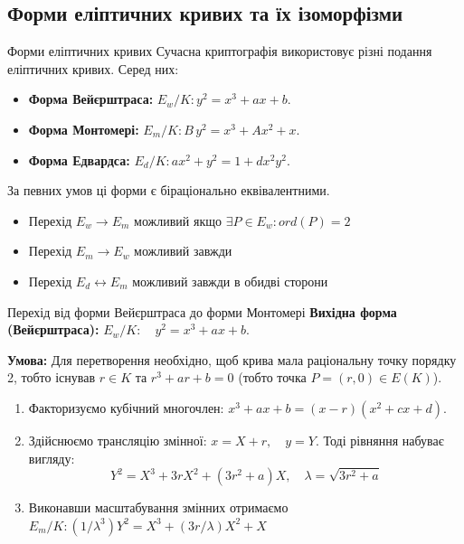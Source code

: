\documentclass[9pt]{beamer}
\begin{document}
\begin{darkframes}

\section{Форми еліптичних кривих та їх ізоморфізми}
\begin{frame}{Форми еліптичних кривих}
  Сучасна криптографія використовує різні подання еліптичних кривих. Серед них:
  \begin{itemize}
    \item \textbf{Форма Вейєрштраса:} \( E_w/K: y^2 = x^3 + ax + b \).
    \item \textbf{Форма Монтомері:} \( E_m/K: B\, y^2 = x^3 + A x^2 + x \).
    \item \textbf{Форма Едвардса:} \( E_d/K : a x^2 + y^2 = 1 + d x^2 y^2 \).
  \end{itemize}
  За певних умов ці форми є біраціонально еквівалентними. 
  \begin{itemize}
      \item Перехід $E_w \rightarrow E_m$ можливий якщо $\exists P\in E_w: ord(P)=2$
      \item Перехід $E_m \rightarrow E_w$ можливий завжди
      \item Перехід $E_d \leftrightarrow E_m$ можливий завжди в обидві сторони
  \end{itemize}
\end{frame}

\begin{frame}{Перехід від форми Вейєрштраса до форми Монтомері}
  \textbf{Вихідна форма (Вейєрштраса):}  
  $
  E_w/K: \quad y^2 = x^3 + ax + b.
  $
  
  \textbf{Умова:}  
  Для перетворення необхідно, щоб крива мала раціональну точку порядку 2, тобто існував \(r\in K\) та \(r^3+ar+b=0\) (тобто точка \(P=(r,0) \in E(K)\)).
  \begin{enumerate}
      \item Факторизуємо кубічний многочлен:
  $
  x^3 + ax + b = (x - r)(x^2 + cx + d).
  $
  \item Здійснюємо трансляцію змінної:
  $
  x = X + r, \quad y = Y.
  $
  Тоді рівняння набуває вигляду:
  \[
  Y^2 = X^3 + 3r X^2 + (3r^2+a)X,\quad \lambda=\sqrt{3r^2+a}
  \]
  \item Виконавши масштабування змінних отримаємо $ E_m/K: (1/\lambda ^3)Y^2 = X^3+(3r/\lambda)X^2 + X$
  \end{enumerate}
  


\end{frame}
\end{darkframes}
\end{document}
